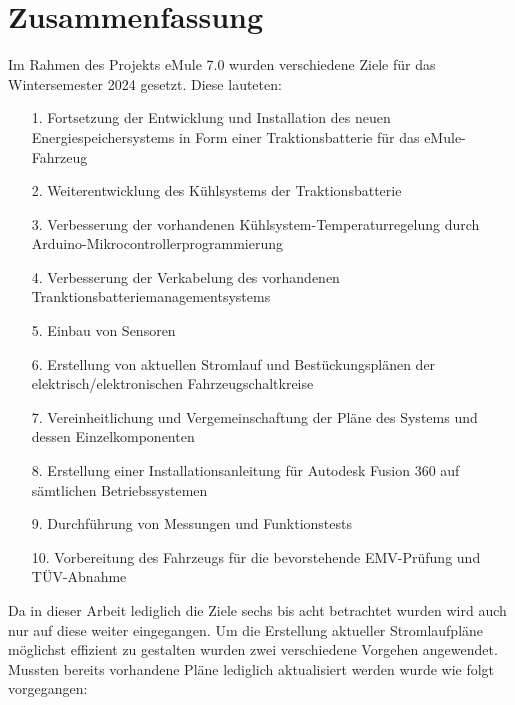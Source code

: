 \chapter{Zusammenfassung}
\label{cha:zusammenfassung}



	Im Rahmen des Projekts eMule 7.0 wurden verschiedene Ziele für das Wintersemester 2024 gesetzt. Diese lauteten:
	\begin{itemize}
		\item[1.] Fortsetzung der Entwicklung und Installation des neuen Energiespeichersystems in Form einer Traktionsbatterie für das eMule-Fahrzeug
		\item[2.] Weiterentwicklung des Kühlsystems der Traktionsbatterie
		\item[3.] Verbesserung der vorhandenen Kühlsystem-Temperaturregelung durch Arduino-Mikrocontrollerprogrammierung
		\item[4.] Verbesserung der Verkabelung des vorhandenen Tranktionsbatteriemanagementsystems
		\item[5.] Einbau von Sensoren
		\item[6.] Erstellung von aktuellen Stromlauf und Bestückungsplänen der elektrisch/elektronischen Fahrzeugschaltkreise
		\item[7.] Vereinheitlichung und Vergemeinschaftung der Pläne des Systems und dessen Einzelkomponenten
		\item[8.] Erstellung einer Installationsanleitung für Autodesk Fusion 360 auf sämtlichen Betriebssystemen
		\item[9.]Durchführung von Messungen und Funktionstests
		\item[10.] Vorbereitung des Fahrzeugs für die bevorstehende EMV-Prüfung und TÜV-Abnahme
	\end{itemize}
Da in dieser Arbeit lediglich die Ziele sechs bis acht betrachtet wurden wird auch nur auf diese weiter eingegangen. \newline
Um die Erstellung aktueller Stromlaufpläne möglichst effizient zu gestalten wurden zwei verschiedene Vorgehen angewendet. Mussten bereits vorhandene Pläne lediglich aktualisiert werden wurde wie folgt vorgegangen:\newline
